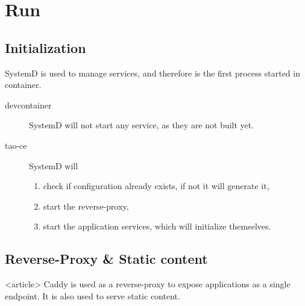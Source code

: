 \section{Run \taoce}

\subsection{Initialization}
\begin{frame}
    \alert{SystemD} is used to manage \taoce services, and therefore is the first process started in container.

    \begin{description}
        \item[devcontainer] SystemD will not start any service, as they are not built yet.
        \item[tao-ce] SystemD will \begin{enumerate} 
            \item check if configuration already exists, if not it will generate it,
            \item start the reverse-proxy,
            \item start the application services, which will initialize themselves.
        \end{enumerate} 
    \end{description}
\end{frame}

\subsection<article>{Reverse-Proxy \& Static content}
\begin{frame}<article>
    \alert{Caddy} is used as a reverse-proxy to expose applications as a single endpoint. It is also used to serve static content.
\end{frame}

